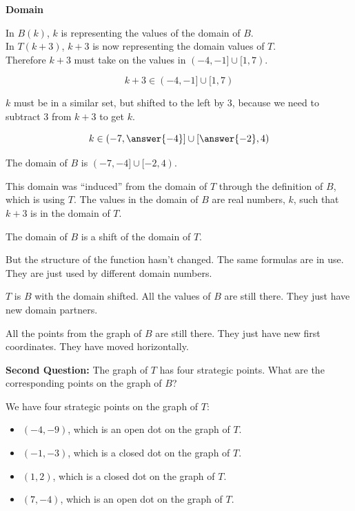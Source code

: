 \documentclass{ximera}
\begin{document}
\begin{explanation} \textbf{\textcolor{red!75!green}{Domain}} 

In $B(k)$, $k$ is representing the values of the domain of $B$. \\
In $T(k + 3)$,  $k+3$ is now representing the domain values of $T$.  \\
Therefore $k+3$ must take on the values in $(-4,-1] \cup [1,7)$.

\[     k+3 \in      (-4,-1] \cup [1,7)     \]


$k$ must be in a similar set, but shifted to the left by $3$, because we need to subtract $3$ from $k+3$ to get $k$.


\[     k \in      \left( -7,\answer{-4} \right] \cup \left[ \answer{-2},4 \right)     \]


The domain of $B$ is $(-7,-4] \cup [-2,4)$.   

This domain was ``induced'' from the domain of $T$ through the definition of $B$, which is using $T$.  The values in the domain of $B$ are real numbers, $k$, such that $k+3$ is in the domain of $T$.

The domain of $B$ is a shift of the domain of $T$.  


But the structure of the function hasn't changed.  The same formulas are in use.  They are just used by different domain numbers.



\end{explanation}

$T$ is $B$ with the domain shifted. All the values of $B$ are still there. They just have new domain partners.  

All the points from the graph of $B$ are still there.  They just have new first coordinates.  They have moved horizontally.


\textbf{\textcolor{purple!85!blue}{Second Question:}}  The graph of $T$ has four strategic points.  What are the corresponding points on the graph of $B$?


We have four strategic points on the graph of $T$: 

\begin{itemize}

\item $(-4, -9)$, which is an open dot on the graph of $T$.
\item $(-1, -3)$, which is a closed dot on the graph of $T$.
\item $(1, 2)$, which is a closed dot on the graph of $T$.
\item $(7, -4)$, which is an open dot on the graph of $T$.

\end{itemize}
\end{document}
